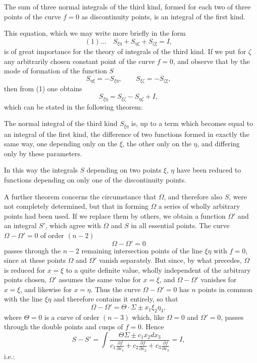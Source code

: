 \documentclass[10pt]{article}
\begin{document}
The sum of three normal integrals of the third kind, formed for each two of three points of the curve $f=0$ as discontinuity points, is an integral of the first kind.

This equation, which we may write more briefly in the form
\[
(1)\ldots\quad S_{\xi\eta}+S_{\eta\zeta}+S_{\zeta\xi}=I,
\]
is of great importance for the theory of integrals of the third kind. If we put for $\zeta$ any arbitrarily chosen constant point of the curve $f=0$, and observe that by the mode of formation of the function $S$
\[
S_{\eta\xi}=-S_{\xi\eta},
\qquad
S_{\xi\zeta}=-S_{\zeta\xi},
\]
then from (1) one obtains
\[
S_{\xi\eta}=S_{\xi\zeta}-S_{\eta\zeta}+I,
\]
which can be stated in the following theorem:

The normal integral of the third kind $S_{\xi\eta}$ is, up to a term which becomes equal to an integral of the first kind, the difference of two functions formed in exactly the same way, one depending only on the $\xi$, the other only on the $\eta$, and differing only by these parameters.

In this way the integrals $S$ depending on two points $\xi$, $\eta$ have been reduced to functions depending on only one of the discontinuity points.

A further theorem concerns the circumstance that $\Omega$, and therefore also $S$, were not completely determined, but that in forming $\Omega$ a series of wholly arbitrary points had been used. If we replace them by others, we obtain a function $\Omega'$ and an integral $S'$, which agree with $\Omega$ and $S$ in all essential points. The curve $\Omega-\Omega'=0$ of order $(n-2)$
\[
\Omega-\Omega'=0
\]
passes through the $n-2$ remaining intersection points of the line $\xi\eta$ with $f=0$, since at these points $\Omega$ and $\Omega'$ vanish separately. But since, by what precedes, $\Omega$ is reduced for $x=\xi$ to a quite definite value, wholly independent of the arbitrary points chosen, $\Omega'$ assumes the same value for $x=\xi$, and $\Omega-\Omega'$ vanishes for $x=\xi$, and likewise for $x=\eta$. Thus the curve $\Omega-\Omega'=0$ has $n$ points in common with the line $\xi\eta$ and therefore contains it entirely, so that
\[
\Omega-\Omega'=\Theta\cdot\Sigma\pm x_1\xi_2\eta_3,
\]
where $\Theta=0$ is a curve of order $(n-3)$ which, like $\Omega=0$ and $\Omega'=0$, passes through the double points and cusps of $f=0$. Hence
\[
S-S'=\int\frac{\Theta\Sigma\pm c_1x_2dx_3}{c_1\frac{\partial f}{\partial x_1}+c_2\frac{\partial f}{\partial x_2}+c_3\frac{\partial f}{\partial x_3}}=I,
\]
i.e.:
\end{document}
